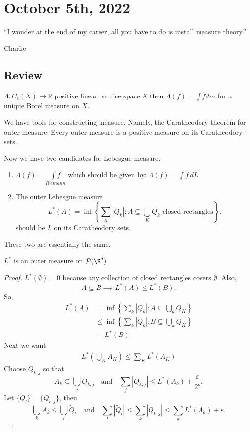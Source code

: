 \section{October 5th, 2022}

\epigraph{``I wonder at the end of my career, all you have to do is install measure theory.''}{Charlie}

\subsection*{Review}

\begin{theorem}[Riesz]
	$\Lambda : C_c (X) \to \mathbb{R}$ positive linear on nice space $X$ then $\Lambda(f) = \int f dm$ for a unique Borel measure on $X$.
\end{theorem}

We have tools for constructing measure. Namely, the Caratheodory theorem for outer measure: Every outer measure is a positive measure on its Caratheodory sets.

Now we have two candidates for Lebesgue measure.

\begin{enumerate}
	\item $\Lambda (f) = \underset{Riemann}{\int f}$
		which should be given by: $\Lambda(f) = \int f \,dL$
	\item The outer Lebesgue measure \[
		L^* (A) = \inf \left\{\sum_K |Q_k| : A \subseteq \bigcup_{K} Q_k \text{ closed rectangles}\right\}.
	\]
  should be $L$ on its Caratheodory sets.
\end{enumerate}

These two are essentially the same.

\begin{lemma}
	$L^*$ is an outer measure on $\mathcal{P}(\R^d)$
\end{lemma}

\begin{proof}
	$L^* (\emptyset)= 0$ because any collection of closed rectangles covers $\emptyset$. Also,
	\[
		A \subseteq B \implies L^*(A) \leq L^*(B).
	\]
  So,
	 \begin{align*}
	L^*(A) & = \inf \left\{\sum_{k} |Q_k| : A \subseteq \bigcup_{k} Q_K \right\} \\
         & \leq \inf\left\{\sum_{k} |Q_k| : B \subseteq \bigcup_{k} Q_K \right\} \\
         & = L^*(B)
	\end{align*}
	Next we want
	\begin{align*}
	L^* \left( \bigcup_{K} A_K \right) \leq \sum_{K} L^* (A_K)
	\end{align*}
	Choose $Q_{k,j}$ so that
	\[
		A_k \subseteq \bigcup_{j} Q_{k,j} \quad \text{and} \quad \sum_{j} | Q_{k,j} | \leq L^* (A_{k}) + \frac{\varepsilon}{2^{k}}.
	\]
	Let $\{\tilde{Q}_{l}\} = \{Q_{k,j}\}$, then
	\[
		\bigcup_{k}A_{k} \leq \bigcup_{l} \tilde{Q}_{l} \quad \text{and} \quad
		\sum_{l} | \tilde{Q}_{l} | \leq \sum_{k} |Q_{k,j} | \leq \sum_{k} L^* (A_k) + \varepsilon.
	\]
\end{proof}

